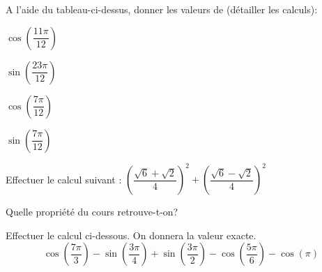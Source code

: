 \documentclass[11pt,a4paper]{article}  %
\begin{document}
\begin{enumMet}
	\item A l'aide du tableau-ci-dessus, donner les valeurs de (détailler les calculs):
	\begin{enumMet}
		\item $\cos\left(\dfrac{11\pi}{12}\right)$
		\item {} $\sin\left(\dfrac{23\pi}{12}\right)$
		\item $\cos\left(\dfrac{7\pi}{12}\right)$
		\item {} $\sin\left(\dfrac{7\pi}{12}\right)$
	\end{enumMet}
	\item 
	\begin{enumMet}
		\item Effectuer le calcul suivant : $\left(\dfrac{\sqrt{6}+\sqrt{2}}{4}\right)^2+\left(\dfrac{\sqrt{6}-\sqrt{2}}{4}\right)^2$
		\item Quelle propriété du cours retrouve-t-on?
	\end{enumMet}
\end{enumMet}

Effectuer le calcul ci-dessous. On donnera la valeur exacte.
$$\cos \left(\dfrac{7\pi}{3}\right)-\sin \left(\dfrac{3\pi}{4}\right)+\sin \left(\dfrac{3\pi}{2}\right)-\cos \left(\dfrac{5\pi}{6}\right)-\cos(\pi)$$
\end{document}
